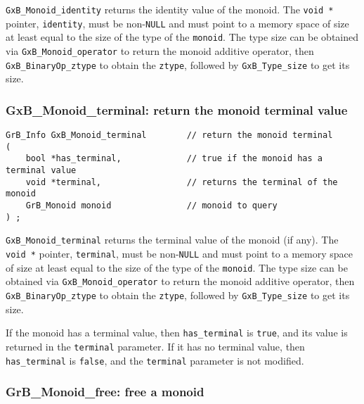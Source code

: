 \documentclass[12pt]{article}
\begin{document}
\verb'GxB_Monoid_identity' returns the identity value of the monoid.  The
\verb'void *' pointer, \verb'identity', must be non-\verb'NULL' and must point
to a memory space of size at least equal to the size of the type of the
\verb'monoid'.  The type size can be obtained via \verb'GxB_Monoid_operator' to
return the monoid additive operator, then \verb'GxB_BinaryOp_ztype' to obtain
the \verb'ztype', followed by \verb'GxB_Type_size' to get its size.

\newpage
\subsubsection{{\sf GxB\_Monoid\_terminal:} return the monoid terminal value}
\label{monoid_terminal}

\begin{mdframed}[userdefinedwidth=6in]
{\footnotesize
\begin{verbatim}
GrB_Info GxB_Monoid_terminal        // return the monoid terminal
(
    bool *has_terminal,             // true if the monoid has a terminal value
    void *terminal,                 // returns the terminal of the monoid
    GrB_Monoid monoid               // monoid to query
) ;
\end{verbatim}
} \end{mdframed}

\verb'GxB_Monoid_terminal' returns the terminal value of the monoid (if any).
The \verb'void *' pointer, \verb'terminal', must be non-\verb'NULL' and must
point to a memory space of size at least equal to the size of the type of the
\verb'monoid'.  The type size can be obtained via \verb'GxB_Monoid_operator' to
return the monoid additive operator, then \verb'GxB_BinaryOp_ztype' to obtain
the \verb'ztype', followed by \verb'GxB_Type_size' to get its size.

If the monoid has a terminal value, then \verb'has_terminal' is \verb'true',
and its value is returned in the \verb'terminal' parameter.  If it has no
terminal value, then \verb'has_terminal' is \verb'false', and the
\verb'terminal' parameter is not modified.

\subsubsection{{\sf GrB\_Monoid\_free:} free a monoid}
\label{monoid_free}
\end{document}
